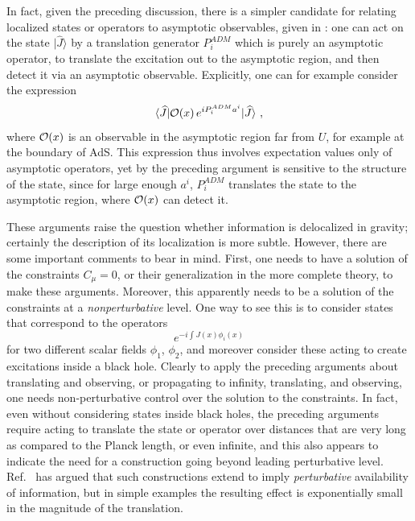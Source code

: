 \documentclass[12pt]{article}
\numberwithin{equation}{section}
\newcommand{\calo}{{\cal O}}
\newcommand{\beq}{\begin{equation}}
\newcommand{\eeq}{\end{equation}}
\begin{document}
In fact, given the preceding discussion, there is a simpler candidate for relating localized states or operators to asymptotic observables, given in \cite{DoGi3}:  one can act on the state $|\hat J\rangle$ by a translation generator $P_i^{ADM}$ which is purely an asymptotic operator, to translate the excitation out to the asymptotic region, and then detect it via an asymptotic observable.  Explicitly, one can for example consider the expression
\beq
\langle\widehat J|{\cal O}(x)\, e^{i P_i^{ADM} a^i} |\widehat J\rangle \ ,
\eeq
where $\calo(x)$ is an observable in the asymptotic region far from $U$, for example at the boundary of AdS.  This expression thus involves expectation values only of asymptotic operators, yet by the preceding argument is sensitive to the structure of the state, since for large enough $a^i$, $P_i^{ADM}$ translates the state to the asymptotic region, where $\calo(x)$ can detect it.

These arguments raise the question whether information is delocalized in gravity; certainly the description of its localization is more subtle.  However, there are some important comments to bear in mind.  First, one needs to have a solution of the constraints $C_\mu=0$, or their generalization in the more complete theory, to make these arguments.  Moreover, this apparently needs to be a solution of the constraints at a {\it nonperturbative} level.  One way to see this is to consider states that correspond to the operators
\beq
e^{-i\int J(x)\phi_i(x)}
\eeq
for two different scalar fields $\phi_1$, $\phi_2$, and moreover consider these acting to create excitations inside a black hole.  Clearly to apply the preceding arguments about translating and observing, or propagating to infinity, translating, and observing, one needs non-perturbative control over the solution to the constraints.  In fact, even without considering states inside black holes, the preceding arguments require acting to translate the state or operator over distances that are very long as compared to the Planck length, or even infinite, and this also appears to indicate the need for a construction going beyond leading perturbative level. Ref.~\cite{LPRS} has argued that  such constructions extend to imply {\it perturbative} availability of information, but in simple examples the resulting effect is exponentially small in the magnitude of the translation.
\end{document}
